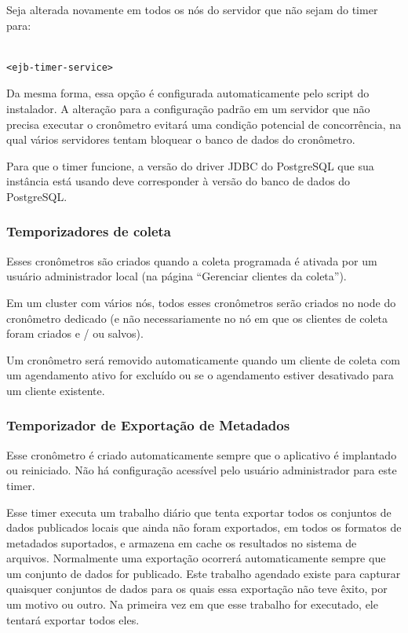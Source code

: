 \documentclass[12pt,hidelinks]{article}
\begin{document}
Seja alterada novamente em todos os nós do servidor que não sejam do timer para: 

\begin{verbatim}

<ejb-timer-service> 

\end{verbatim}

Da mesma forma, essa opção é configurada automaticamente pelo script do instalador. A alteração para a configuração padrão em um servidor que não precisa executar o cronômetro evitará uma condição potencial de concorrência, na qual vários servidores tentam bloquear o banco de dados do cronômetro.

Para que o timer funcione, a versão do driver JDBC do PostgreSQL que sua instância está usando deve corresponder à versão do banco de dados do PostgreSQL.

\subsubsection{Temporizadores de coleta}

\qquad Esses cronômetros são criados quando a coleta programada é ativada por um usuário administrador local (na página “Gerenciar clientes da coleta”).

Em um cluster com vários nós, todos esses cronômetros serão criados no node do cronômetro dedicado (e não necessariamente no nó em que os clientes de coleta foram criados e / ou salvos).

Um cronômetro será removido automaticamente quando um cliente de coleta com um agendamento ativo for excluído ou se o agendamento estiver desativado para um cliente existente.

\subsubsection{Temporizador de Exportação de Metadados}

\qquad Esse cronômetro é criado automaticamente sempre que o aplicativo é implantado ou reiniciado.
Não há configuração acessível pelo usuário administrador para este timer.

Esse timer executa um trabalho diário que tenta exportar todos os conjuntos de dados publicados locais que ainda não foram exportados, em todos os formatos de metadados suportados, e armazena em cache os resultados no sistema de arquivos. Normalmente uma exportação ocorrerá automaticamente sempre que um conjunto de dados for publicado. Este trabalho agendado existe para capturar quaisquer conjuntos de dados para os quais essa exportação não teve êxito, por um motivo ou outro. Na primeira vez em que esse trabalho for executado, ele tentará exportar todos eles.
\end{document}
